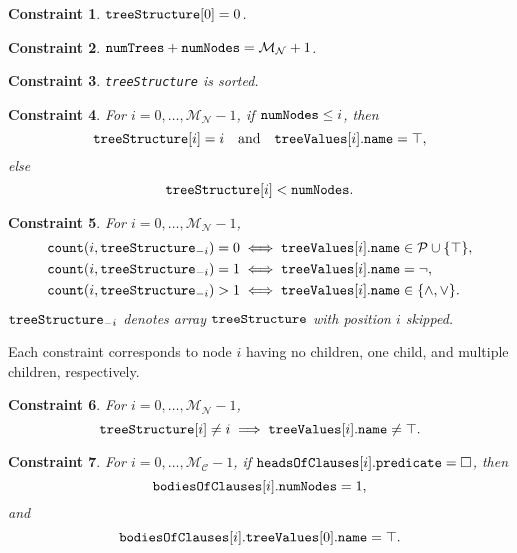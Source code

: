\documentclass[runningheads]{llncs}
\newtheorem{constraint}{Constraint}
\newcommand{\variable}[1]{\texttt{\textup{#1}}}
\newcommand{\predicates}{\mathcal{P}}
\newcommand{\maxNumNodes}{\mathcal{M}_{\mathcal{N}}}
\newcommand{\maxNumClauses}{\mathcal{M}_{\mathcal{C}}}
\begin{document}
\begin{constraint}
  $\variable{treeStructure}[0] = 0$.
\end{constraint}

\begin{constraint}
  $\variable{numTrees} + \variable{numNodes} = \maxNumNodes{} + 1$.
\end{constraint}

\begin{constraint}
  \variable{treeStructure} is sorted.
\end{constraint}

\begin{constraint}
  For $i = 0, \dots, \maxNumNodes{} - 1$, if $\variable{numNodes} \le
  i$, then
  \[
    \variable{treeStructure}[i] = i \quad \text{and} \quad
    \variable{treeValues}[i].\variable{name} = \top,
  \]
  else
  \[
    \variable{treeStructure}[i] < \variable{numNodes}.
  \]
\end{constraint}

\begin{constraint}
  For $i = 0, \dots, \maxNumNodes{} - 1$,
  \begin{align*}
    \variable{count}(i, \variable{treeStructure}_{-i}) = 0 &\iff \variable{treeValues}[i].\variable{name} \in \predicates{} \cup \{ \top \},\\
    \variable{count}(i, \variable{treeStructure}_{-i}) = 1 &\iff \variable{treeValues}[i].\variable{name} = \neg,\\
    \variable{count}(i, \variable{treeStructure}_{-i}) > 1 &\iff \variable{treeValues}[i].\variable{name} \in \{ \land, \lor \}.
  \end{align*}
  $\variable{treeStructure}_{-i}$ denotes array $\variable{treeStructure}$ with
  position $i$ skipped.
\end{constraint}
Each constraint corresponds to node $i$ having no children, one child, and
multiple children, respectively.


\begin{constraint}
  For $i = 0, \dots, \maxNumNodes{} - 1$,
  \[
    \variable{treeStructure}[i] \ne i \implies
    \variable{treeValues}[i].\variable{name} \ne \top.
  \]
\end{constraint}

\begin{constraint}
  For $i = 0, \dots, \maxNumClauses{} - 1$, if
  $\variable{headsOfClauses}[i].\variable{predicate} = \Box$, then
  \[
    \variable{bodiesOfClauses}[i].\variable{numNodes} = 1,
  \]
  and
  \[
    \variable{bodiesOfClauses}[i].\variable{treeValues}[0].\variable{name} =
    \top.
  \]
\end{constraint}
\end{document}
